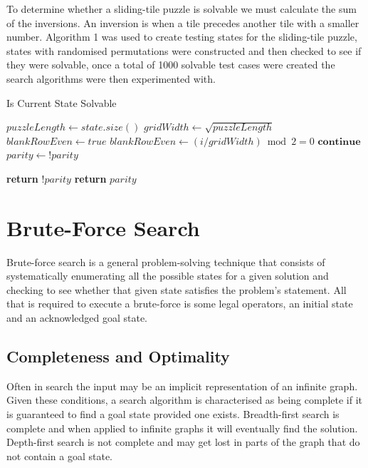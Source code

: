 \documentclass[final]{cmpreport}
\begin{document}
To determine whether a sliding-tile puzzle is solvable we must calculate the sum of the inversions.
An inversion is when a tile precedes another tile with a smaller number. 
Algorithm 1 was used to create testing states for the sliding-tile puzzle, states with randomised permutations were constructed and then checked to see if they were solvable, once a total of 1000 solvable test cases were created the search algorithms were then experimented with.
\begin{algorithm}
	\caption{Is Current State Solvable}\label{Solvable}
	\begin{algorithmic}[H]
		\State $puzzleLength \gets state.size()$
		\State 	$gridWidth \gets \sqrt{puzzleLength}$
		\State $blankRowEven \gets true$
		\State $blankRowEven \gets (i / gridWidth) \bmod 2 = 0$
		\State $\textbf{continue} $
		\State $parity \gets !parity$
		\EndIf
		\EndFor
		\EndIf 
		\EndFor
		
		\State \textbf{return} $!parity$
		\EndIf
		\State \textbf{return} $parity$
		
		\EndProcedure
	\end{algorithmic}	
\end{algorithm}	





\section{Brute-Force Search}
Brute-force search is a general problem-solving technique that consists of systematically enumerating all the possible states for a given solution and checking to see whether that given state satisfies the problem's statement. All that is required to execute a brute-force is some legal operators, an initial state and an acknowledged goal state. 
\subsection{Completeness and Optimality}
 Often in search the input may be an implicit representation of an infinite graph. Given these conditions, a search algorithm is characterised as being complete if it is guaranteed to find a goal state provided one exists. Breadth-first search is complete and when applied to infinite graphs it will eventually find the solution. Depth-first search is not complete and may get lost in parts of the graph that do not contain a goal state.
\end{document}

